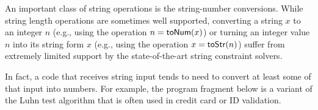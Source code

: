 \documentclass[sigplan,review,anonymous]{acmart}\settopmatter{printfolios=true,printccs=false,printacmref=false}
\begin{document}
An important class of string operations is  the string-number conversions.  While string length operations are sometimes well supported, converting a string $x$ to an integer $n$ (e.g., using the operation $n = \mbox{\textsf{toNum}($x$)}$) or turning an integer value $n$ into its string form $x$ (e.g., using the operation $x = \mbox{\textsf{toStr}($n$)}$)  suffer from extremely limited support by the state-of-the-art string constraint solvers. 

In fact, a code that receives string input tends to need to convert at least some of that input into numbers.
For example, the program fragment below is a variant of the Luhn test algorithm that is often used in credit card or ID validation.



%
%









\end{document}
